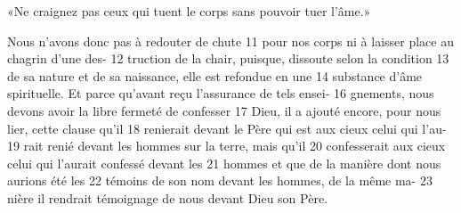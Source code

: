 «Ne craignez pas ceux qui tuent le corps sans pouvoir tuer l’âme.»

Nous n'avons donc pas à redouter de chute	 
11	 	pour nos corps ni à laisser place au chagrin d'une des-	 
12	 	truction de la chair, puisque, dissoute selon la condition	 
13	 	de sa nature et de sa naissance, elle est refondue en une	 
14	 	substance d'âme spirituelle.
Et parce qu'avant reçu l'assurance de tels ensei-	 
16	 	gnements, nous devons avoir la libre fermeté de confesser	 
17	 	Dieu, il a ajouté encore, pour nous lier, cette clause qu'il	 
18	 	renierait devant le Père qui est aux cieux celui qui l'au-	 
19	 	rait renié devant les hommes sur la terre, mais qu'il	 
20	 	confesserait aux cieux celui qui l'aurait confessé devant les	 
21	 	hommes et que de la manière dont nous aurions été les	 
22	 	témoins de son nom devant les hommes, de la même ma-	 
23	 	nière il rendrait témoignage de nous devant Dieu son Père.